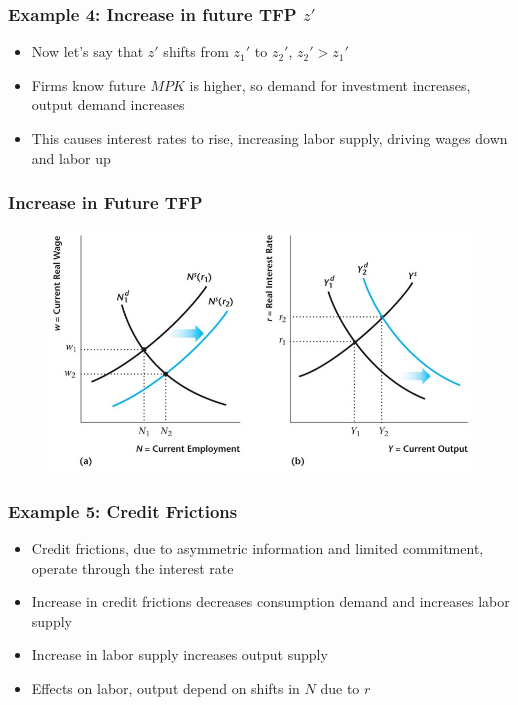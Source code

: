 \documentclass{beamer}
\begin{document}
\begin{frame}
\frametitle[alignment=center]{Example 4: Increase in future TFP $z'$} 
\begin{itemize}
\item Now let's say that $z'$ shifts from  $z_1'$ to $z_2'$, $z_2'>z_1'$
\bigskip
\item Firms know future $MPK$ is higher, so demand for investment increases, output demand increases
\bigskip
\item This causes interest rates to rise, increasing labor supply, driving wages down and labor up
\end{itemize}
\end{frame}

\begin{frame} 
\frametitle[alignment=center]{Increase in Future TFP} 
\begin{figure}
\centering
\includegraphics[scale=0.52]{Figures/W_Fig_11pt27.png}
\end{figure}
\end{frame}


\begin{frame}
\frametitle[alignment=center]{Example 5: Credit Frictions} 
\begin{itemize}
\item Credit frictions, due to asymmetric information and limited commitment, operate through the interest rate
\bigskip
\item Increase in credit frictions decreases consumption demand and increases labor supply
\bigskip
\item Increase in labor supply increases output supply
\bigskip
\item Effects on labor, output depend on shifts in $N$ due to $r$
\bigskip
\end{itemize}
\end{frame}
\end{document}
